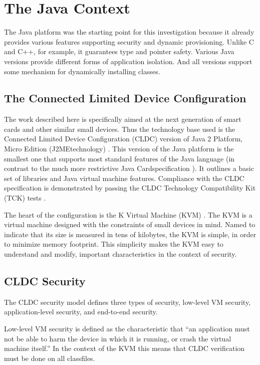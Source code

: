 \documentclass{llncs}
\begin{document}
\section{The Java Context}

The Java platform was the starting point for this investigation
because it already provides various features supporting security
and dynamic provisioning. Unlike C and C++, for example, it guarantees
type and pointer safety. Various Java versions provide different
forms of application isolation. And all versions support some
mechanism for dynamically installing classes.

\subsection{The Connected Limited Device Configuration}

The work described here is specifically aimed at the next generation
of smart cards and other similar small devices. Thus the technology
base used is the Connected Limited Device Configuration (CLDC)
version of Java 2 Platform, Micro Edition (J2ME\texttrademark technology) \cite{cldc}.
This version of the Java platform is the smallest one that supports
most standard features of the Java language (in contrast to the
much more restrictive Java Card\texttrademark specification \cite{javacard}). It outlines
a basic set of libraries and Java virtual machine features. Compliance
with the CLDC specification is demonstrated by passing the CLDC
Technology Compatibility Kit (TCK) tests \cite{tck}.

The heart of the configuration is the K Virtual Machine (KVM) \cite{kvm}.
The KVM is a virtual machine designed with the constraints of small
devices in mind. Named to indicate that its size is measured in
tens of kilobytes, the KVM is simple, in order to minimize memory
footprint. This simplicity makes the KVM easy to understand and
modify, important characteristics in the context of security.

\subsection{CLDC Security}

The CLDC security model \cite[section 3.4]{cldc} defines three types of
security, low-level VM security, application-level security, and
end-to-end security.

Low-level VM security is defined as the characteristic that ``an
application must not be able to harm the device in which it is
running, or crash the virtual machine itself.'' In the context of
the KVM this means that CLDC verification must be done on all
classfiles.
\end{document}

